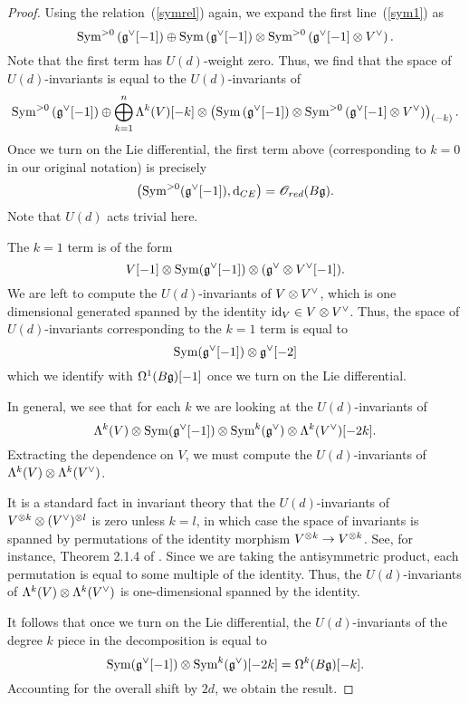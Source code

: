 \begin{proof}
Using the relation~(\ref{symrel}) again, we expand the first line~(\ref{sym1}) as
\[
 {\rm Sym}^{>0} \left(\mathfrak g^\vee[-1]\right) \oplus {\rm Sym} \left(\mathfrak g^\vee[-1]\right) \otimes {\rm Sym}^{>0} \left(\mathfrak g^\vee [-1] \otimes V^\vee\right) .
 \]
Note that the first term has $U(d)$-weight zero. 
Thus, we find that the space of $U(d)$-invariants is equal to the $U(d)$-invariants of
\[
 {\rm Sym}^{>0} \left(\mathfrak g^\vee[-1]\right) \oplus \bigoplus_{k = 1}^n \Lambda^k(V) [-k] \otimes \left({\rm Sym} \left(\mathfrak g^\vee[-1]\right) \otimes {\rm Sym}^{>0} \left(\mathfrak g^\vee [-1] \otimes V^\vee\right) \right)_{(-k)} .
\]
Once we turn on the Lie differential, the first term above (corresponding to $k=0$ in our original notation) is precisely 
\[
\left({\rm Sym}^{>0}(\mathfrak g^\vee[-1]), {\rm d}_{CE}\right) = \mathscr O_{red}(B \mathfrak g) .
\]
Note that $U(d)$ acts trivial here.

The $k=1$ term is of the form
\[
V[-1] \otimes {\rm Sym} (\mathfrak g^\vee[-1]) \otimes (\mathfrak g^\vee \otimes V^\vee[-1]) .
\]
We are left to compute the $U(d)$-invariants of $V \otimes V^\vee$, which is one dimensional generated spanned by the identity ${\rm id}_V \in V \otimes V^\vee$. 
Thus, the space of $U(d)$-invariants corresponding to the $k=1$ term is equal to 
\[
{\rm Sym} (\mathfrak g^\vee [-1]) \otimes \mathfrak g^\vee [-2] 
\]
which we identify with $\Omega^{1}(B\mathfrak g)[-1]$ once we turn on the Lie differential. 

In general, we see that for each $k$ we are looking at the $U(d)$-invariants of
\[
\Lambda^k(V) \otimes {\rm Sym} (\mathfrak g^\vee[-1]) \otimes {\rm Sym}^k(\mathfrak g^\vee) \otimes \Lambda^k(V^\vee) [-2k]  .
\]
Extracting the dependence on $V$, we must compute the $U(d)$-invariants of $\Lambda^k(V) \otimes \Lambda^k(V^\vee)$.

It is a standard fact in invariant theory that the $U(d)$-invariants of $V^{\otimes k} \otimes (V^\vee)^{\otimes l}$ is zero unless $k=l$, in which case the 
space of invariants is spanned by permutations of the identity morphism $V^{\otimes k} \to V^{\otimes k}$. 
See, for instance, Theorem 2.1.4 of \cite{Fuks}. 
Since we are taking the antisymmetric product, each permutation is equal to some multiple of the identity. 
Thus, the $U(d)$-invariants of $\Lambda^k(V) \otimes \Lambda^k(V^\vee)$ is one-dimensional spanned by the identity. 

It follows that once we turn on the Lie differential, the $U(d)$-invariants of the degree $k$ piece in the decomposition is equal to
\[
{\rm Sym} (\mathfrak g^\vee[-1]) \otimes {\rm Sym}^k(\mathfrak g^\vee) [-2k] = \Omega^{k} (B \mathfrak g) [-k] .
\]
Accounting for the overall shift by $2d$, we obtain the result. 
\end{proof}

